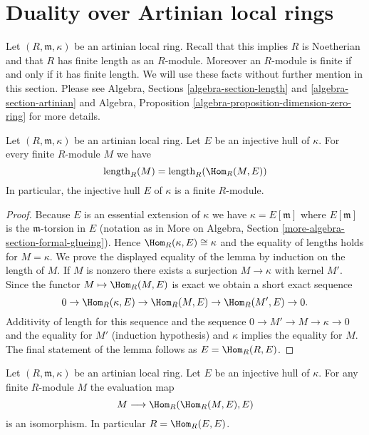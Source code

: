 \section{Duality over Artinian local rings}
\label{section-artinian}

\noindent
Let $(R, \mathfrak m, \kappa)$ be an artinian local ring.
Recall that this implies $R$ is Noetherian and that $R$ has finite
length as an $R$-module. Moreover an $R$-module is finite if and
only if it has finite length. We will use these facts without
further mention in this section. Please see
Algebra, Sections \ref{algebra-section-length} and
\ref{algebra-section-artinian}
and
Algebra, Proposition \ref{algebra-proposition-dimension-zero-ring}
for more details.

\begin{lemma}
\label{lemma-finite}
Let $(R, \mathfrak m, \kappa)$ be an artinian local ring.
Let $E$ be an injective hull of $\kappa$. For every finite
$R$-module $M$ we have
$$
\text{length}_R(M) = \text{length}_R(\Hom_R(M, E))
$$
In particular, the injective hull $E$ of $\kappa$ is a finite $R$-module.
\end{lemma}

\begin{proof}
Because $E$ is an essential extension of $\kappa$ we have
$\kappa = E[\mathfrak m]$ where $E[\mathfrak m]$ is the
$\mathfrak m$-torsion in $E$ (notation as in More on Algebra, Section
\ref{more-algebra-section-formal-glueing}).
Hence $\Hom_R(\kappa, E) \cong \kappa$ and the equality of lengths
holds for $M = \kappa$. We prove the displayed equality of the lemma
by induction on the length of $M$. If $M$ is nonzero there exists a surjection
$M \to \kappa$ with kernel $M'$. Since the functor $M \mapsto \Hom_R(M, E)$
is exact we obtain a short exact sequence
$$
0 \to \Hom_R(\kappa, E) \to \Hom_R(M, E) \to \Hom_R(M', E) \to 0.
$$
Additivity of length for this sequence and the sequence
$0 \to M' \to M \to \kappa \to 0$ and the equality for $M'$ (induction
hypothesis) and $\kappa$ implies the equality for $M$.
The final statement of the lemma follows as $E = \Hom_R(R, E)$.
\end{proof}

\begin{lemma}
\label{lemma-evaluate}
Let $(R, \mathfrak m, \kappa)$ be an artinian local ring.
Let $E$ be an injective hull of $\kappa$.
For any finite $R$-module $M$ the evaluation map
$$
M \longrightarrow \Hom_R(\Hom_R(M, E), E)
$$
is an isomorphism. In particular $R = \Hom_R(E, E)$.
\end{lemma}

